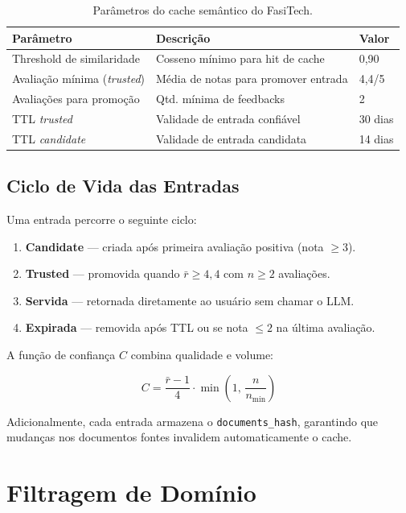 \documentclass[12pt,a4paper]{report}
\begin{document}
\begin{table}[H]
\centering
\caption{Parâmetros do cache semântico do FasiTech.}
\label{tab:cache}
\begin{tabularx}{\textwidth}{lXl}
\toprule
\textbf{Parâmetro} & \textbf{Descrição} & \textbf{Valor} \\
\midrule
Threshold de similaridade & Cosseno mínimo para hit de cache & 0,90 \\
Avaliação mínima (\textit{trusted}) & Média de notas para promover entrada & 4,4/5 \\
Avaliações para promoção & Qtd. mínima de feedbacks & 2 \\
TTL \textit{trusted} & Validade de entrada confiável & 30 dias \\
TTL \textit{candidate} & Validade de entrada candidata & 14 dias \\
\bottomrule
\end{tabularx}
\end{table}

\subsection{Ciclo de Vida das Entradas}

Uma entrada percorre o seguinte ciclo:

\begin{enumerate}
  \item \textbf{Candidate} — criada após primeira avaliação positiva (nota $\geq 3$).
  \item \textbf{Trusted} — promovida quando $\bar{r} \geq 4{,}4$ com $n \geq 2$ avaliações.
  \item \textbf{Servida} — retornada diretamente ao usuário sem chamar o LLM.
  \item \textbf{Expirada} — removida após TTL ou se nota $\leq 2$ na última avaliação.
\end{enumerate}

A função de confiança $C$ combina qualidade e volume:

\begin{equation}
  C = \frac{\bar{r} - 1}{4} \cdot \min\!\left(1,\,\frac{n}{n_{\min}}\right)
\end{equation}

Adicionalmente, cada entrada armazena o \texttt{documents\_hash}, garantindo
que mudanças nos documentos fontes invalidem automaticamente o cache.

\section{Filtragem de Domínio}
\end{document}
